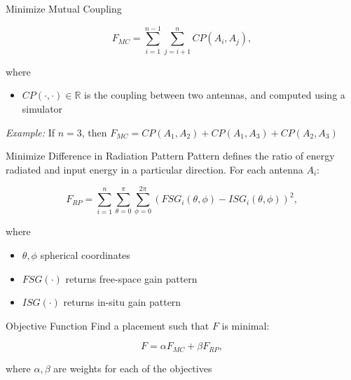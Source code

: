 \documentclass{beamer}
\begin{document}
\begin{frame}{Minimize Mutual Coupling}
    \begin{tcolorbox}[colback=green!5]
        \begin{equation}
            F_{MC} = \sum_{i=1}^{n-1}\sum_{j=i+1}^{n} CP(A_i, A_j),
        \end{equation}
    \end{tcolorbox}
    where
    \begin{itemize}
        \item $CP(\cdot, \cdot) \in \mathbb R$ is the coupling between two antennas, and computed using a simulator
    \end{itemize}
    \vspace{2mm}
    \small\textit{Example:} If $n=3$, then $F_{MC} = CP(A_1, A_2) + CP(A_1, A_3) + CP(A_2, A_3)$
\end{frame}


\begin{frame}{Minimize Difference in Radiation Pattern}
    Pattern defines the ratio of energy radiated and input energy in a particular direction. For each antenna $A_i$:
    \begin{tcolorbox}[colback=green!5]
        \begin{equation} \label{eq:rp}
            F_{RP} = \sum_{i=1}^n\sum_{\theta=0}^\pi\sum_{\phi=0}^{2\pi}
            \left( FSG_i(\theta,\phi) - ISG_i(\theta,\phi) \right) ^2,
        \end{equation}
    \end{tcolorbox}
    where
    \begin{itemize}
            \small
        \item $\theta, \phi$ spherical coordinates
        \item $FSG(\cdot)$ returns free-space gain pattern  
        \item $ISG(\cdot)$ returns in-situ gain pattern
    \end{itemize}

\end{frame}

\begin{frame}{Objective Function}
    Find a placement such that $F$ is minimal:
    \begin{tcolorbox}[colback=green!5]
        \begin{equation} \label{eq:optimal}
            F = \alpha F_{MC} + \beta F_{RP},
        \end{equation}
    \end{tcolorbox}
    where $\alpha, \beta$ are weights for each of the objectives 
\end{frame}
\end{document}
